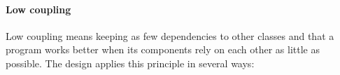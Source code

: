 \documentclass[a4paper]{scrartcl}
\begin{document}


\paragraph{Low coupling}
Low coupling means keeping as few dependencies to other classes and that a program works better when its components rely on each other as little as possible. The design applies this principle in several ways:
\end{document}
